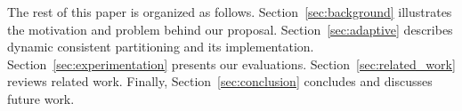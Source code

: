The rest of this paper is organized as
follows. Section~\ref{sec:background} illustrates the motivation and
problem behind our proposal.  Section~\ref{sec:adaptive} describes
dynamic consistent partitioning and its
implementation. Section~\ref{sec:experimentation} presents our
evaluations.  Section~\ref{sec:related_work} reviews related
work. Finally, Section~\ref{sec:conclusion} concludes and discusses
future work.
  

